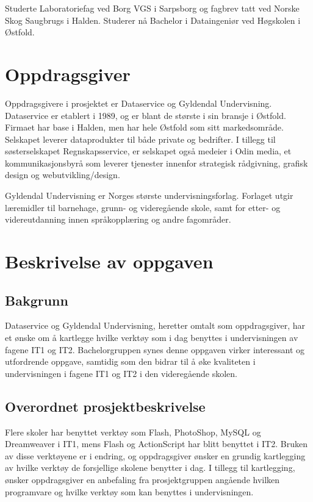 \documentclass[norsk,a4paper,12pt]{article}
\begin{document}
Studerte Laboratoriefag ved Borg VGS i Sarpsborg og fagbrev tatt ved Norske Skog Saugbrugs i Halden. Studerer nå Bachelor i Dataingeniør ved Høgskolen i Østfold.


\section{Oppdragsgiver}

Oppdragsgivere i prosjektet er Dataservice og Gyldendal Undervisning. Dataservice er etablert i 1989, og er blant de største i sin bransje i Østfold. Firmaet har base i Halden, men har hele Østfold som sitt markedsområde. Selskapet leverer dataprodukter til både private og bedrifter. I tillegg til søsterselskapet Regnskapsservice, er selskapet også medeier i Odin media, et kommunikasjonsbyrå som leverer tjenester innenfor strategisk rådgivning, grafisk design og webutvikling/design.\newline

Gyldendal Undervisning er Norges største undervisningsforlag. Forlaget utgir læremidler til barnehage, grunn- og videregående skole, samt for etter- og videreutdanning innen språkopplæring og andre fagområder.

\newpage

\section{Beskrivelse av oppgaven}

\subsection{Bakgrunn}

Dataservice og Gyldendal Undervisning, heretter omtalt som oppdragsgiver,  har et ønske om å kartlegge hvilke verktøy som i dag benyttes i undervisningen av fagene IT1 og IT2.
Bachelorgruppen synes denne oppgaven virker interessant og utfordrende oppgave, samtidig som den bidrar til å øke kvaliteten i undervisningen i fagene IT1 og IT2 i den videregående skolen. 

\subsection{Overordnet prosjektbeskrivelse}

 

Flere skoler har benyttet verktøy som Flash, PhotoShop, MySQL og Dreamweaver i IT1, mens Flash og ActionScript har blitt benyttet i IT2. 
Bruken av disse verktøyene er i endring, og oppdragsgiver ønsker en grundig kartlegging av hvilke verktøy de forsjellige skolene benytter i dag. I tillegg til kartlegging,  ønsker oppdragsgiver en anbefaling fra prosjektgruppen angående hvilken programvare og hvilke verktøy som kan benyttes i undervisningen. 
\end{document}
